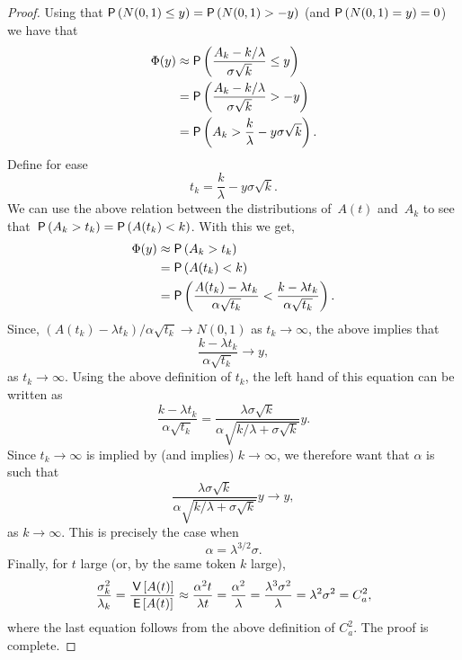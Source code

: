 \begin{proof}
Using that $\P{N(0,1) \leq y} =
\P{N(0,1) > -y}$ (and $\P{N(0,1)=y} = 0$) we have that
%
\begin{align*}
\Phi(y) &\approx \P{\frac{A_k - k/\lambda}{\sigma \sqrt k }\leq y} \\
        &= \P{\frac{A_k - k/\lambda}{\sigma \sqrt k} >  -y} \\
        &=  \P{A_k >  \frac k\lambda - y \sigma \sqrt k}.
\end{align*}
Define for ease
\begin{equation*}
t_k = \frac{k}\lambda - y \sigma \sqrt k.
\end{equation*}
We can use the above relation between the distributions of~$A(t)$
and~$A_k$ to see that~$\P{A_k >t_k } = \P{A(t_k) <k}$. With this we
get,
\begin{align*}
\Phi(y)
        &\approx  \P{A_k >  t_k } \\
        &=  \P{A(t_k) <  k } \\
        &=  \P{\frac{A(t_k) - \lambda t_k}{\alpha \sqrt{t_k}} < 
\frac{k-\lambda t_k}{\alpha \sqrt{t_k}}}.
\end{align*}
Since, $(A(t_k) - \lambda t_k)/ \alpha \sqrt{t_k} \to N(0,1)$
as $t_k \to \infty$, the above implies that
\begin{equation*}
\frac{k-\lambda t_k}{\alpha \sqrt{t_k}} \to y,
\end{equation*}
as $t_k \to \infty$.  Using the above definition of $t_k$, the left
hand of this equation can be written as
\begin{equation*}
\frac{k-\lambda t_k}{\alpha \sqrt{t_k}} =
\frac{\lambda \sigma \sqrt k }{\alpha \sqrt{k/\lambda + \sigma\sqrt k}} y.
\end{equation*}
Since $t_k \to \infty$ is implied by (and implies)
$k\to\infty$, we therefore want that $\alpha$ is such that
\begin{equation*}
\frac{\lambda \sigma \sqrt k }{\alpha \sqrt{k/\lambda + \sigma\sqrt k}} y \to y,
\end{equation*}
as $k\to\infty$. This is precisely the case when
\begin{equation*}
\alpha = \lambda^{3/2}\sigma.
\end{equation*}
Finally, for $t$ large (or, by the same token $k$ large),
\begin{equation*}
\frac{\sigma_k^2}{\lambda_k} = \frac{\,\mathsf{V}\left[A(t)\right]}{\,\mathsf{E}\left[A(t)\right]} \approx \frac{\alpha^2 t}{\lambda t} 
= \frac{\alpha^2}{\lambda} = \frac{\lambda^3\sigma^2}{\lambda} = \lambda^2 \sigma^2 = C_a^2,
\end{equation*}
where the last equation follows from the above definition of $C_a^2$.  The proof is complete.
\end{proof}








